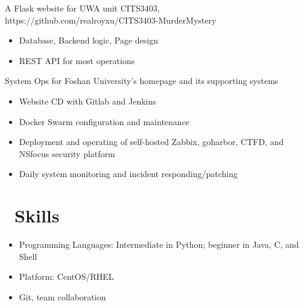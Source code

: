 \documentclass{resume}
\begin{document}
A Flask website for UWA unit CITS3403, https://github.com/realroyxu/CITS3403-MurderMystery
\begin{itemize}
  \item Database, Backend logic, Page design
  \item REST API for most operations
\end{itemize}

System Ops for Foshan University's homepage and its supporting systems
\begin{itemize}
  \item Website CD with Gitlab and Jenkins
  \item Docker Swarm configuration and maintenance
  \item Deployment and operating of self-hosted Zabbix, goharbor, CTFD, and NSfocus security platform
  \item Daily system monitoring and incident responding/patching
\end{itemize}


\section{\faCogs\ Skills}
\begin{itemize}[parsep=0.5ex]
  \item Programming Languages: Intermediate in Python; beginner in Java, C, and Shell
  \item Platform: CentOS/RHEL
  \item Git, team collaboration
\end{itemize}

\end{document}
